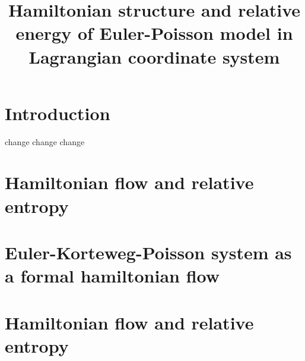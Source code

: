 \documentclass[10pt, letterpaper]{article}
\author{}
\date{}
\title{Hamiltonian structure and relative energy of Euler-Poisson model in Lagrangian coordinate system}
\theoremstyle{definition}
\theoremstyle{remark}
\begin{document}
\maketitle
\tableofcontents

\section{Introduction}

change change change

\section{Hamiltonian flow and relative entropy}



\section{Euler-Korteweg-Poisson system as a formal hamiltonian flow}

\section{Hamiltonian flow and relative entropy}
\end{document}
